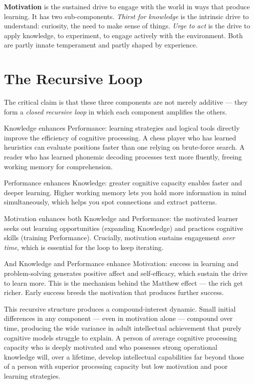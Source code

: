 \documentclass[11pt, twoside, openright]{book}
\begin{document}
\textbf{Motivation} is the sustained drive to engage with the world in ways that produce learning. It has two sub-components. \textit{Thirst for knowledge} is the intrinsic drive to understand: curiosity, the need to make sense of things. \textit{Urge to act} is the drive to apply knowledge, to experiment, to engage actively with the environment. Both are partly innate temperament and partly shaped by experience.

\section*{The Recursive Loop}

The critical claim is that these three components are not merely additive --- they form a \textit{closed recursive loop} in which each component amplifies the others.

Knowledge enhances Performance: learning strategies and logical tools directly improve the efficiency of cognitive processing. A chess player who has learned heuristics can evaluate positions faster than one relying on brute-force search. A reader who has learned phonemic decoding processes text more fluently, freeing working memory for comprehension.

Performance enhances Knowledge: greater cognitive capacity enables faster and deeper learning. Higher working memory lets you hold more information in mind simultaneously, which helps you spot connections and extract patterns.

Motivation enhances both Knowledge and Performance: the motivated learner seeks out learning opportunities (expanding Knowledge) and practices cognitive skills (training Performance). Crucially, motivation sustains engagement \textit{over time}, which is essential for the loop to keep iterating.

And Knowledge and Performance enhance Motivation: success in learning and problem-solving generates positive affect and self-efficacy, which sustain the drive to learn more. This is the mechanism behind the Matthew effect --- the rich get richer. Early success breeds the motivation that produces further success.

This recursive structure produces a compound-interest dynamic. Small initial differences in any component --- even in motivation alone --- compound over time, producing the wide variance in adult intellectual achievement that purely cognitive models struggle to explain. A person of average cognitive processing capacity who is deeply motivated and who possesses strong operational knowledge will, over a lifetime, develop intellectual capabilities far beyond those of a person with superior processing capacity but low motivation and poor learning strategies.
\end{document}
